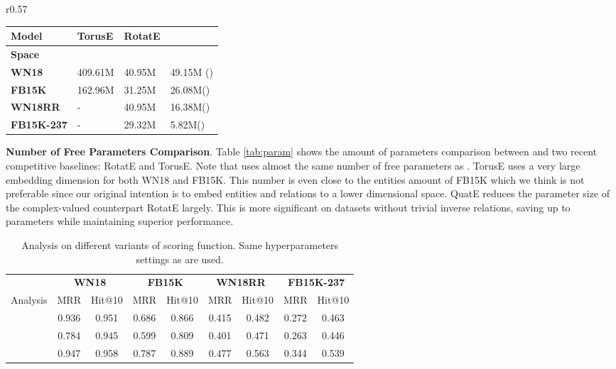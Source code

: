 \documentclass{article}
\begin{document}
\begin{wraptable}{r}{0.57\textwidth}
\centering
\caption{Number of free parameters comparison.}
\small
\begin{tabular}{llll}
\hline
\textbf{Model}   & TorusE  & RotatE &    \\ \hline
  \textbf{Space}  &   &        &     \\
 \textbf{WN18}   & 409.61M &   40.95M      & 49.15M ()    \\
  \textbf{FB15K}   & 162.96M&31.25M       &26.08M()  \\
   \textbf{WN18RR}   &-&   40.95M      & 16.38M() \\
 \textbf{FB15K-237} &-  &   29.32M &    5.82M()    \\ \hline
\end{tabular}
\vspace{-1em}
\label{tab:param}
\end{wraptable}
\textbf{Number of Free Parameters Comparison}. Table \ref{tab:param} shows the amount of parameters comparison between  and two recent competitive baselines: RotatE and TorusE. Note that  uses almost the same number of free parameters as . TorusE uses a very large embedding dimension  for both WN18 and FB15K. This number is even close to the entities amount of FB15K which we think is not preferable since our original intention is to embed entities and relations to a lower dimensional space. QuatE reduces the parameter size of the complex-valued counterpart RotatE largely. This is more significant on datasets without trivial inverse relations, saving up to  parameters while maintaining superior performance.









\begin{table}[]
\small
\caption{Analysis on different variants of scoring function. Same hyperparameters settings as  are used. }
\centering
\begin{tabular}{lcccccccc}
\toprule
 & \multicolumn{2}{c}{\textbf{WN18}} & \multicolumn{2}{c}{\textbf{FB15K}} & \multicolumn{2}{c}{\textbf{WN18RR}} & \multicolumn{2}{c}{\textbf{FB15K-237}} \\
Analysis & MRR  & Hit@10  & MRR & Hit@10  & MRR  & Hit@10 & MRR    & Hit@10    \\ \midrule
  &    0.936            &   0.951                &    0.686             &    0.866              &        0.415          &    0.482                 &          0.272         &    0.463                 \\
     &   0.784     &   0.945   &     0.599        &   0.809       &    0.401      &      0.471              &    0.263    &  0.446         \\
  &       0.947         &    0.958               &       0.787           &            0.889       &           0.477       &    0.563                &           0.344        &      0.539               \\ \bottomrule
\end{tabular}
\vspace{-1em}
\label{ablation}
\end{table}
\end{document}
